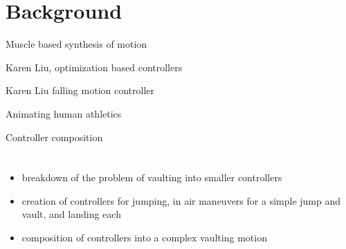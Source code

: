 \documentclass[12pt]{article}
\begin{document}
	\section{Background}
		Muscle based synthesis of motion
		
		Karen Liu, optimization based controllers
		
		Karen Liu falling motion controller
		
		Animating human athletics
		
		Controller composition
		
	\section{}
		
		\begin{itemize}
			\item breakdown of the problem of vaulting into smaller controllers
			\item creation of controllers for jumping, in air maneuvers for a simple jump and vault, and landing each
			\item composition of controllers into a complex vaulting motion
		\end{itemize}
\end{document}
